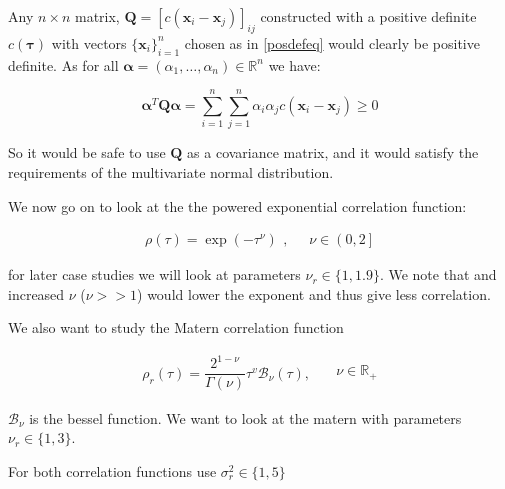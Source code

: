 \documentclass[]{article}
\newcommand{\vect}[1]{\ensuremath{\boldsymbol{\mathbf{#1}}}}
\newcommand{\matr}[1]{\ensuremath{\boldsymbol{\mathbf{#1}}}}
\begin{document}
Any \(n \times n\) matrix,
\(\matr Q = \left[ c(\vect x_i - \vect x_j) \right]_{ij}\) constructed
with a positive definite \(c(\vect \tau)\) with vectors
\(\lbrace \vect x_i \rbrace_{i=1}^n\) chosen as in \eqref{posdefeq}
would clearly be positive definite. As for all
\(\vect \alpha = (\alpha_1, \dots, \alpha_n) \in \mathbb{R}^n\) we have:

\begin{equation}
    \vect \alpha^T \matr Q \vect \alpha =   \sum_{i=1}^n\sum_{j=1}^n\alpha_i\alpha_j c(\vect x_i - \vect x_j) \geq 0
\end{equation}

So it would be safe to use \(\matr Q\) as a covariance matrix, and it
would satisfy the requirements of the multivariate normal distribution.

We now go on to look at the the powered exponential correlation
function:

\begin{equation}
    \begin{split}
            \rho(\tau) = \exp(-\tau^{\nu}) 
    \end{split}, \quad
    \begin{split}
    \nu \in \left(0, 2 \right]
    \end{split}
\end{equation}

for later case studies we will look at parameters
\(\nu_r \in \lbrace 1, 1.9 \rbrace\). We note that and increased \(\nu\)
(\(\nu >> 1\)) would lower the exponent and thus give less correlation.

We also want to study the Matern correlation function

\begin{equation}
    \begin{split}
            \rho_r(\tau) = \dfrac{2^{1-\nu}}{\Gamma(\nu)}\tau^v\mathcal{B}_\nu(\tau), \quad
    \end{split}
    \begin{split}
        \nu \in \mathbb{R}_+
    \end{split}
\end{equation}

\(\mathcal{B}_\nu\) is the bessel function. We want to look at the
matern with parameters \(\nu_r \in \lbrace 1, 3 \rbrace\).

For both correlation functions use
\(\sigma^2_r \in \lbrace 1, 5\rbrace\)
\end{document}
